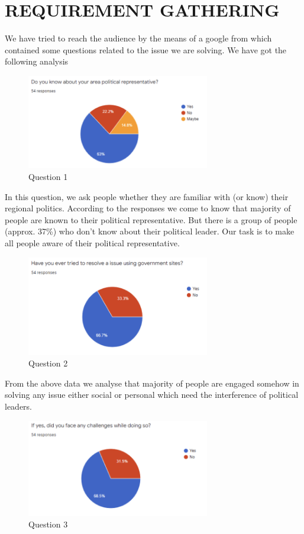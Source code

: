 \documentclass[acmtog]{acmart}
\begin{document}
\section{REQUIREMENT GATHERING}
We have tried to reach the audience by the means of a google from which contained some questions related to the issue we are solving. We have got the following analysis

\begin{figure}[H]
    \includegraphics[width=8cm]{Resources/q1}
    \caption{Question 1}
    \label{fig:q1}
\end{figure}

In this question, we ask people whether they are familiar with (or know) their regional politics. According to the responses we come to know that majority of people are known to their political representative. But there is a group of people (approx. 37\%) who don’t know about their political leader. Our task is to make all people aware of their political representative.

\begin{figure}[H]
    \includegraphics[width=8cm]{Resources/q2}
    \caption{Question 2}
    \label{fig:q2}
\end{figure}

From the above data we analyse that majority of people are engaged somehow in solving any issue either social or personal which need the interference of political leaders.

\begin{figure}[H]
    \includegraphics[width=8cm]{Resources/q3}
    \caption{Question 3}
    \label{fig:q3}
\end{figure}
\end{document}
